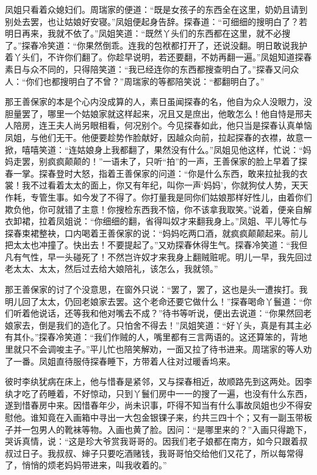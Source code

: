 \documentclass[12pt,oneside]{book}
\begin{document}
凤姐只看着众媳妇们。周瑞家的便道：“既是女孩子的东西全在这里，奶奶且请到别处去罢，也让姑娘好安寝。”凤姐便起身告辞。探春道：“可细细的搜明白了？若明日再来，我就不依了。”凤姐笑道：“既然丫头们的东西都在这里，就不必搜了。”探春冷笑道：“你果然倒乖。连我的包袱都打开了，还说没翻。明日敢说我护着丫头们，不许你们翻了。你趁早说明，若还要翻，不妨再翻一遍。”凤姐知道探春素日与众不同的，只得陪笑道：“我已经连你的东西都搜查明白了。”探春又问众人：“你们也都搜明白了不曾？”周瑞家的等都陪笑说：“都翻明白了。”

那王善保家的本是个心内没成算的人，素日虽闻探春的名，他自为众人没眼力，没胆量罢了，哪里一个姑娘家就这样起来，况且又是庶出，他敢怎么！他自恃是邢夫人陪房，连王夫人尚另眼相看，何况别个。今见探春如此，他只当是探春认真单恼凤姐，与他们无干。他便要趁势作脸献好，因越众向前，拉起探春的衣襟，故意一掀，嘻嘻笑道：“连姑娘身上我都翻了，果然没有什么。”凤姐见他这样，忙说：“妈妈走罢，别疯疯颠颠的！”一语未了，只听“拍”的一声，王善保家的脸上早着了探春一掌。探春登时大怒，指着王善保家的问道：“你是什么东西，敢来拉扯我的衣裳！我不过看着太太的面上，你又有年纪，叫你一声‘妈妈’，你就狗仗人势，天天作耗，专管生事。如今发了不得了。你打量我是同你们姑娘那样好性儿，由着你们欺负他，你可就错了主意！你搜检东西我不恼，你不该拿我取笑。”说着，便亲自解衣卸裙，拉着凤姐说：“你细细的翻，省得叫奴才来翻我身上。”凤姐、平儿等忙与探春束裙整袂，口内喝着王善保家的说：“妈妈吃两口酒，就疯疯颠颠起来。前儿把太太也冲撞了。快出去！不要提起了。”又劝探春休得生气。探春冷笑道：“我但凡有气性，早一头碰死了！不然岂许奴才来我身上翻贼赃呢。明儿一早，我先回过老太太、太太，然后过去给大娘陪礼，该怎么，我就领。”

那王善保家的讨了个没意思，在窗外只说：“罢了，罢了，这也是头一遭挨打。我明儿回了太太，仍回老娘家去罢。这个老命还要它做什么！”探春喝命丫鬟道：“你们听着他说话，还等我和他对嘴去不成？”待书等听说，便出去说道：“你果然回老娘家去，倒是我们的造化了。只怕舍不得去！”凤姐笑道：“好丫头，真是有其主必有其仆。”探春冷笑道：“我们作贼的人，嘴里都有三言两语的。这还算笨的，背地里就只不会调唆主子。”平儿忙也陪笑解劝，一面又拉了待书进来。周瑞家的等人劝了一番。凤姐直待服侍探春睡下，方带着人往对过暖香坞来。

彼时李纨犹病在床上，他与惜春是紧邻，又与探春相近，故顺路先到这两处。因李纨才吃了药睡着，不好惊动，只到丫鬟们房中一一的搜了一遍，也没有什么东西，遂到惜春房中来。因惜春年少，尚未识事，吓得不知当有什么事故凤姐也少不得安慰他。谁知竟在入画箱中寻出一大包金银锞子来，约共三四十个；又有一副玉带板子并一包男人的靴袜等物。入画也黄了脸。因问：“是哪里来的？”入画只得跪下，哭诉真情，说：“这是珍大爷赏我哥哥的。因我们老子娘都在南方，如今只跟着叔叔过日子。我叔叔、婶子只要吃酒赌钱，我哥哥怕交给他们又花了，所以每常得了，悄悄的烦老妈妈带进来，叫我收着的。”
\end{document}
